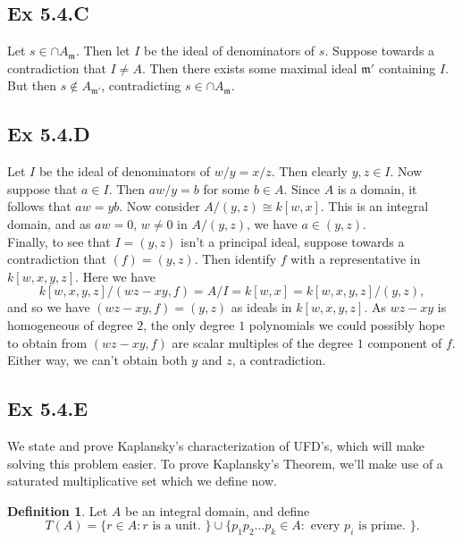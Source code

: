 \documentclass{article}
\theoremstyle{definition}
\newtheorem{definition}[theorem]{Definition}
\begin{document}
\subsection*{Ex 5.4.C}

Let $s \in \cap A_{\mathfrak{m}}$. Then let $I$ be the ideal of denominators of
$s$. Suppose towards a contradiction that $I \not = A$. Then there exists some
maximal ideal $\mathfrak{m}'$ containing $I$. But then $s \not \in
A_{\mathfrak{m}'}$, contradicting $s \in \cap A_{\mathfrak{m}}$.

\subsection*{Ex 5.4.D}

Let $I$ be the ideal of denominators of $w/y = x/z$. Then clearly $y, z \in I$.
Now suppose that $a \in I$. Then $aw/y = b$ for some $b \in A$. Since $A$ is a
domain, it follows that $aw = yb$. Now consider $A/(y, z) \cong k[w, x]$. This
is an integral domain, and as $aw = 0,\, w \not = 0$ in $A/(y,z)$, we have $a
\in (y, z)$. \\

Finally, to see that $I = (y, z)$ isn't a principal ideal, suppose towards a
contradiction that $(f) = (y, z)$. Then identify $f$ with a representative in
$k[w,x,y,z]$. Here we have
\[
	k[w,x,y,z]/(wz-xy, f) 
	=
	A/I 
	= 
	k[w, x] 
	= 
	k[w, x, y, z]/(y, z),
\]
and so we have $(wz - xy, f) = (y, z)$ as ideals in $k[w,x,y,z]$. As $wz - xy$
is homogeneous of degree $2$, the only degree $1$ polynomials we could possibly
hope to obtain from $(wz - xy, f)$ are scalar multiples of the degree $1$
component of $f$. Either way, we can't obtain both $y$ and $z$, a contradiction.

\subsection*{Ex 5.4.E}

We state and prove Kaplansky's characterization of UFD's, which will make
solving this problem easier. To prove Kaplansky's Theorem, we'll make use of a
saturated multiplicative set which we define now.

\begin{definition}
	Let $A$ be an integral domain, and define 
	\[
		T(A)
		=
		\{
			r \in A :
			r \text{ is a unit. }
		\}
		\cup
		\{
			p_1p_2 \ldots p_k \in A :
			\text{ every }
			p_i 
			\text{ is prime. }
		\}.
	\] 
\end{definition}
\end{document}
